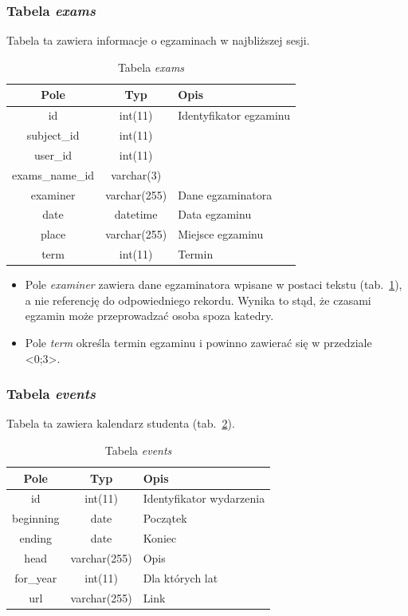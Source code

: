 \documentclass[a4paper,12pt,oneside]{report}
\begin{document}
\subsubsection{Tabela \emph{exams}}
\label{subsub:exams}
Tabela ta zawiera informacje o egzaminach w najbliższej sesji.

\begin{table}[h]
  \centering
  \begin{tabular}{|c|c|l|}\hline
  Pole & Typ & Opis \\\hline
  id   & int(11)   &  Identyfikator egzaminu\\
  subject\_id     & int(11)      & \\
  user\_id        & int(11)      & \\
  exams\_name\_id & varchar(3)   & \\
  examiner        & varchar(255) & Dane egzaminatora \\
  date            & datetime     & Data egzaminu \\
  place           & varchar(255) & Miejsce egzaminu \\
  term            & int(11)      & Termin \\\hline

  \end{tabular}
  \caption{Tabela \emph{exams}\label{tab:exams}}
\end{table}

\begin{itemize}
  \item Pole \emph{examiner} zawiera dane egzaminatora wpisane w postaci tekstu (tab.~\ref{tab:exams}), a nie referencję do odpowiedniego rekordu. Wynika to stąd, że czasami egzamin może przeprowadzać osoba spoza katedry.
  \item Pole \emph{term} określa termin egzaminu i powinno zawierać się w przedziale <0;3>.
\end{itemize}

\newpage
\subsubsection{Tabela \emph{events}}
\label{subsub:events}
Tabela ta zawiera kalendarz studenta (tab.~\ref{tab:events}).

\begin{table}[h]
  \centering
  \begin{tabular}{|c|c|l|}\hline
  Pole & Typ & Opis \\\hline
  id   & int(11)   & Identyfikator wydarzenia\\
  beginning  & date         & Początek \\
  ending     & date         & Koniec \\
  head       & varchar(255) & Opis \\
  for\_year  & int(11)      & Dla których lat \\
  url        & varchar(255) & Link \\\hline
  \end{tabular}
  \caption{Tabela \emph{events}\label{tab:events}}
\end{table}
\end{document}
